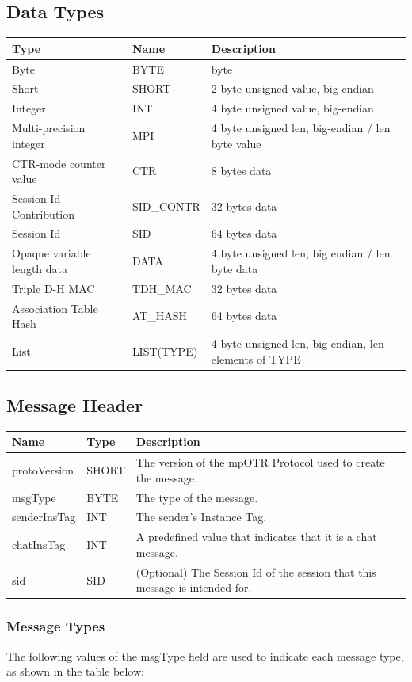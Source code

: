 \documentclass[12pt,titlepage,a4paper]{article}
\begin{document}
\subsection{Data Types}
\begin{tabular}{l l l}
Type & Name & Description \\
\hline
Byte & BYTE & byte \\
Short & SHORT & 2 byte unsigned value, big-endian \\
Integer & INT & 4 byte unsigned value, big-endian \\
Multi-precision integer & MPI & 4 byte unsigned len, big-endian / len byte value \\
CTR-mode counter value & CTR & 8 bytes data \\
Session Id Contribution & SID\_CONTR & 32 bytes data \\
Session Id & SID & 64 bytes data \\
Opaque variable length data & DATA & 4 byte unsigned len, big endian / len byte data \\
Triple D-H MAC & TDH\_MAC & 32 bytes data \\
Association Table Hash & AT\_HASH & 64 bytes data \\
List & LIST(TYPE) & 4 byte unsigned len, big endian, len elements of TYPE \\
\end{tabular}

\subsection{Message Header}

\begin{tabular}{l l l}
Name         & Type  & Description \\
\hline
protoVersion & SHORT & The version of the mpOTR Protocol used to create the message. \\
msgType      & BYTE  & The type of the message. \\
senderInsTag & INT   & The sender's Instance Tag. \\
chatInsTag   & INT   & A predefined value that indicates that it is a chat message. \\
sid          & SID   & (Optional) The Session Id of the session that this message is intended for. \\
\end{tabular}

\subsubsection{Message Types}
The following values of the msgType field are used to indicate each message type, as shown in the table below:
\end{document}
